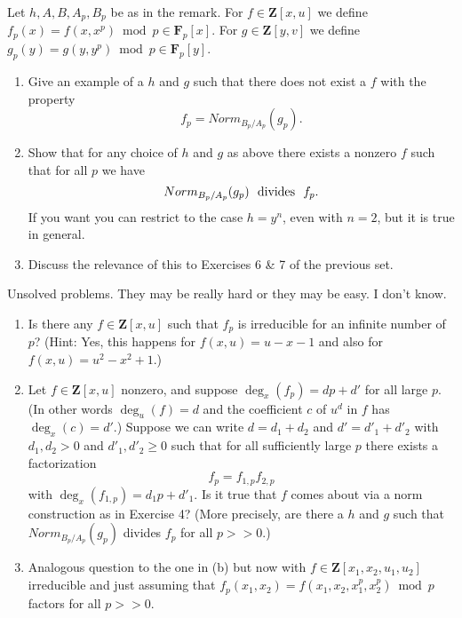 \begin{exercise}
\label{exercise-strange-fp-3}
Let $h, A, B, A_p, B_p$ be as in the remark. For $f \in {\mathbf Z}[x, u]$ we
define $f_p(x) = f(x, x^p) \bmod p \in {\mathbf F}_p[x]$. For
$g \in {\mathbf Z}[y, v]$ we define
$g_p(y) = g(y, y^p) \bmod p \in {\mathbf F}_p[y]$.
\begin{enumerate}
\item Give an example of a $h$ and $g$ such that
there does not exist a $f$ with the property
$$
f_p  =  Norm_{B_p/A_p}(g_p).
$$
\item Show that for any choice of $h$ and $g$ as above
there exists a nonzero $f$ such that for all $p$ we have
$$
Norm_{B_p/A_p}(g_p)\ \ \hbox{divides}\ \ f_p .
$$
If you want you can restrict to the case $h = y^n$, even with $n = 2$,
but it is true in general.
\item Discuss the relevance of this to Exercises 6 \& 7 of the previous
set.
\end{enumerate}
\end{exercise}

\begin{exercise}
\label{exercise-strange-fp-unsolved}
Unsolved problems. They may be really hard or they may be easy.
I don't know.
\begin{enumerate}
\item Is there any $f \in {\mathbf Z}[x, u]$ such that $f_p$ is
irreducible for an infinite number of $p$? (Hint: Yes, this happens for
$f(x, u) = u - x - 1$ and also for $f(x, u) = u^2 - x^2 + 1$.)
\item Let $f \in {\mathbf Z}[x, u]$ nonzero, and suppose
$\deg_x(f_p) = dp + d'$ for all large $p$. (In other words $\deg_u(f) = d$
and the coefficient $c$ of $u^d$ in $f$ has $\deg_x(c) = d'$.) Suppose we
can write $d = d_1 + d_2$ and $d' = d'_1 + d'_2$ with $d_1, d_2 > 0$
and $d'_1, d'_2 \geq 0$ such that for all sufficiently large $p$
there exists a factorization
$$
	f_p = f_{1, p} f_{2, p}
$$
with $\deg_x(f_{1, p}) = d_1p + d'_1$. Is it true that $f$ comes about via a
norm construction as in Exercise 4? (More precisely, are there a $h$ and
$g$ such that $Norm_{B_p/A_p}(g_p)$ divides $f_p$ for all $p >> 0$.)
\item Analogous question to the one in (b) but now with
$f \in {\mathbf Z}[x_1, x_2, u_1, u_2]$ irreducible and just assuming that
$f_p(x_1, x_2) = f(x_1, x_2, x_1^p, x_2^p) \bmod p$ factors for all
$p >> 0$.
\end{enumerate}
\end{exercise}


















